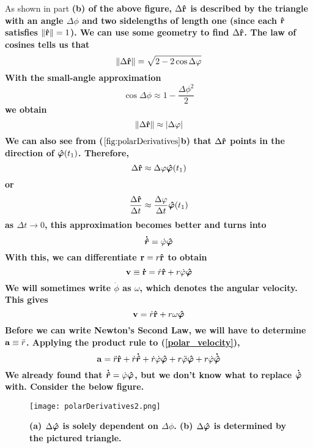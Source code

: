 As shown in part \bf{(b)} of the above figure, $\Delta \mathbf{\hat{r}}$ is described by the triangle with an angle $\Delta \phi$ and two sidelengths of length one (since each $\mathbf{\hat{r}}$ satisfies $\norm{\mathbf{\hat{r}}} = 1$). We can use some geometry to find $\Delta \mathbf{\hat{r}}$. The law of cosines tells us that
\[ \norm{\Delta \mathbf{\hat{r}}} = \sqrt{2 - 2\cos\Delta\varphi}\]
With the small-angle approximation 
\begin{equation} \label{small_angle_polar_unit}
    \cos\Delta\phi \approx 1 - \frac{\Delta \phi ^2}{2}
\end{equation}
we obtain
\[ \norm{\Delta\mathbf{\hat{r}}} \approx \abs{\Delta\varphi} \]
We can also see from ($\ref{fig:polarDerivatives}$b) that $\Delta \mathbf{\hat{r}}$ points in the direction of $\bm{\hat{\varphi}}(t_1)$. Therefore,
\[ \Delta \mathbf{\hat{r}} \approx \Delta \varphi \bm{\hat{\varphi}}(t_1) \]
or
\[ \frac{\Delta \mathbf{\hat{r}}}{\Delta t} \approx \frac{\Delta \varphi}{\Delta t} \bm{\hat{\varphi}}(t_1) \]
as $\Delta t\to 0$, this approximation becomes better and turns into
\[ \bm{\dot{\hat{r}}} = \dot{\varphi}\bm{\hat{\varphi}}\]
With this, we can differentiate $\mathbf{r} = r\mathbf{\hat{r}}$ to obtain
\[ \mathbf{v}\equiv \mathbf{\dot r} = \dot{r}\mathbf{\hat{r}} + r\dot{\varphi}\bm{\hat{\varphi}}\]
We will sometimes write $\dot\phi$ as $\omega$, which denotes the angular velocity. This gives
\begin{equation} \label{polar_velocity}
    \mathbf{v}  = \dot{r}\mathbf{\hat{r}} + r\omega \bm{\hat{\varphi}}
\end{equation}
Before we can write Newton's Second Law, we will have to determine $\mathbf{a}\equiv \ddot{r}$. Applying the product rule to (\ref{polar_velocity}),
\begin{equation} \label{polar_a_unsimplified}
    \mathbf{a} = \ddot{r}\mathbf{\hat{r}} + \dot{r}\bm{\dot{\hat{r}}} + \dot{r} \dot{\varphi} \bm{\hat{\varphi}} + r \ddot{\varphi}\bm{\hat{\varphi}} + r\dot{\varphi}\bm{\dot{\hat{\varphi}}}
\end{equation}
We already found that $\bm{\dot{\hat{r}}} = \dot{\varphi}\bm{\hat{\varphi}}$, but we don't know what to replace $\bm{\dot{\hat{\varphi}}}$ with. Consider the below figure. 
\clearpage
\begin{figure}[t]
    \centering
    \texttt{[image: polarDerivatives2.png]}
    \caption{\bf{(a)} $\Delta \bm{\hat{\varphi}}$ is solely dependent on $\Delta\phi$. \bf{(b)} $\Delta\bm{\hat{\varphi}}$ is determined by the pictured triangle.}
    \label{fig:polarDerivatives2}
\end{figure}

